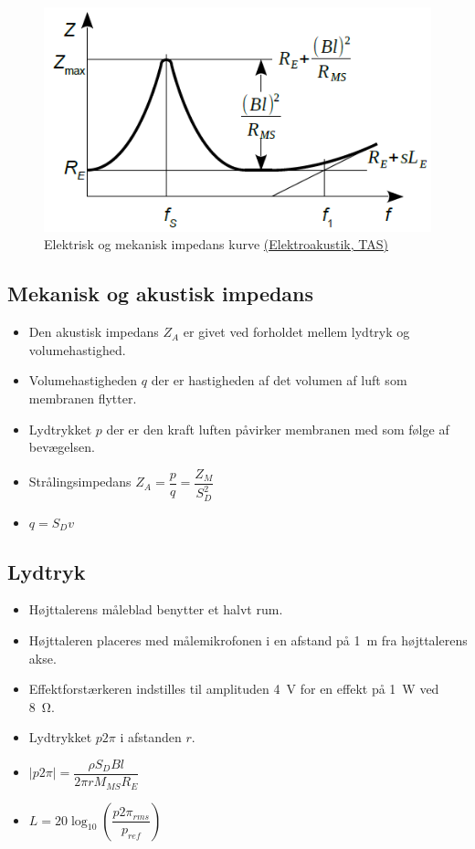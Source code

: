 \begin{figure} [H]
	\centering
	\includegraphics[width=0.7\linewidth]{graphics/28.png}
	\caption{Elektrisk og mekanisk impedans kurve \href{http://www.torean.dk/artikel/Elektroakustik.pdf}{(Elektroakustik, TAS)}}
	\label{fig:28}
\end{figure}

\subsection{Mekanisk og akustisk impedans}
\begin{itemize}
	\item Den akustisk impedans $Z_A$ er givet ved	forholdet mellem lydtryk og volumehastighed.
	\item Volumehastigheden $q$ der er hastigheden af det volumen af
	luft som membranen flytter.
	\item Lydtrykket $p$ der er den kraft luften påvirker membranen med som
	følge af bevægelsen.
	\item Strålingsimpedans $Z_A = \dfrac{p}{q} = \dfrac{Z_M}{S_D^2}$ 
	\item $q = S_D v$
\end{itemize}

\newpage\subsection{Lydtryk}
\begin{itemize}
	\item Højttalerens måleblad benytter et halvt rum.
	\item Højttaleren placeres med målemikrofonen i en afstand på \SI{1}{\meter} fra højttalerens akse.
	\item Effektforstærkeren indstilles til amplituden \SI{4}{\volt} for en effekt på \SI{1}{\watt} ved \SI{8}{\ohm}.
	\item Lydtrykket $p2\pi$ i afstanden $r$.
	\item $|p2\pi|=\dfrac{\rho S_D Bl}{2\pi r M_{MS}R_E}$ 
	\item $L = 20\log_{10}\left(\dfrac{p2\pi_{rms}}{p_{ref}}\right)$
\end{itemize}

